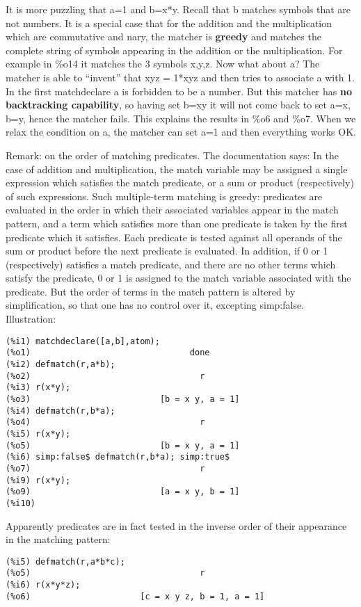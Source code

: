 \documentclass[a4paper,11pt]{article}
\begin{document}
It is more puzzling that a=1 and b=x*y. Recall that b matches symbols
that are not numbers. It is a special case that for the addition and
the multiplication which are commutative and nary, the matcher is
\textbf{greedy} and matches the complete string of symbols appearing in the
addition or the multiplication. For example in \%o14 it matches the 3
symbols x,y,z.  Now what about a? The matcher is able to ``invent'' that
xyz = 1*xyz and then tries to associate a with 1. In the first
matchdeclare a is forbidden to be a number. But this matcher has \textbf{no
backtracking capability}, so having set b=xy it will not come back to
set a=x, b=y, hence the matcher fails. This explains the results in
\%o6 and \%o7. When we relax the condition on a, the matcher can set a=1
and then everything works OK.

Remark: on the order of matching predicates. The documentation says:
In the case of addition and multiplication, the match variable may be
assigned a single expression which satisfies the match predicate, or a
sum or product (respectively) of such expressions. Such multiple-term
matching is greedy: predicates are evaluated in the order in which
their associated variables appear in the match pattern, and a term
which satisfies more than one predicate is taken by the first
predicate which it satisfies. Each predicate is tested against all
operands of the sum or product before the next predicate is
evaluated. In addition, if 0 or 1 (respectively) satisfies a match
predicate, and there are no other terms which satisfy the predicate, 0
or 1 is assigned to the match variable associated with the predicate.
But the order of terms in the match pattern is altered by simplification,
so that one has no control over it, excepting simp:false. Illustration:
\begin{verbatim}
(%i1) matchdeclare([a,b],atom);
(%o1)                                done
(%i2) defmatch(r,a*b);
(%o2)                                  r
(%i3) r(x*y);
(%o3)                          [b = x y, a = 1]
(%i4) defmatch(r,b*a);
(%o4)                                  r
(%i5) r(x*y);
(%o5)                          [b = x y, a = 1]
(%i6) simp:false$ defmatch(r,b*a); simp:true$
(%o7)                                  r
(%i9) r(x*y);
(%o9)                          [a = x y, b = 1]
(%i10) 
\end{verbatim}
Apparently predicates are in fact tested in the inverse order of their appearance 
in the matching pattern:
\begin{verbatim}
(%i5) defmatch(r,a*b*c);
(%o5)                                  r
(%i6) r(x*y*z);
(%o6)                      [c = x y z, b = 1, a = 1]
\end{verbatim}
\end{document}
